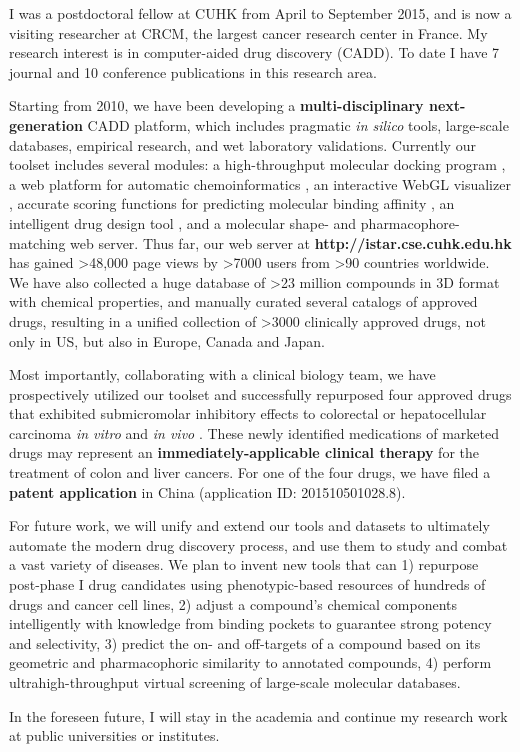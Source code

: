 \documentclass[a4paper,12pt]{article}
\begin{document}
I was a postdoctoral fellow at CUHK from April to September 2015, and is now a visiting researcher at CRCM, the largest cancer research center in France. My research interest is in computer-aided drug discovery (CADD). To date I have 7 journal and 10 conference publications in this research area.

Starting from 2010, we have been developing a \textbf{multi-disciplinary next-generation} CADD platform, which includes pragmatic \textit{in silico} tools, large-scale databases, empirical research, and wet laboratory validations. Currently our toolset includes several modules: a high-throughput molecular docking program \cite{1153}, a web platform for automatic chemoinformatics \cite{1362}, an interactive WebGL visualizer \cite{1366}, accurate scoring functions for predicting molecular binding affinity \cite{1432,1647,1434,1663}, an intelligent drug design tool \cite{1409,1387}, and a molecular shape- and pharmacophore-matching web server. Thus far, our web server at \textbf{http://istar.cse.cuhk.edu.hk} has gained \textgreater48,000 page views by \textgreater7000 users from \textgreater90 countries worldwide. We have also collected a huge database of \textgreater23 million compounds in 3D format with chemical properties, and manually curated several catalogs of approved drugs, resulting in a unified collection of \textgreater3000 clinically approved drugs, not only in US, but also in Europe, Canada and Japan.

Most importantly, collaborating with a clinical biology team, we have prospectively utilized our toolset and successfully repurposed four approved drugs that exhibited submicromolar inhibitory effects to colorectal or hepatocellular carcinoma \textit{in vitro} and \textit{in vivo} \cite{1667,1681}. These newly identified medications of marketed drugs may represent an \textbf{immediately-applicable clinical therapy} for the treatment of colon and liver cancers. For one of the four drugs, we have filed a \textbf{patent application} in China (application ID: 201510501028.8).

For future work, we will unify and extend our tools and datasets to ultimately automate the modern drug discovery process, and use them to study and combat a vast variety of diseases. We plan to invent new tools that can 1) repurpose post-phase I drug candidates using phenotypic-based resources of hundreds of drugs and cancer cell lines, 2) adjust a compound's chemical components intelligently with knowledge from binding pockets to guarantee strong potency and selectivity, 3) predict the on- and off-targets of a compound based on its geometric and pharmacophoric similarity to annotated compounds, 4) perform ultrahigh-throughput virtual screening of large-scale molecular databases.

In the foreseen future, I will stay in the academia and continue my research work at public universities or institutes.

\linespread{0.5}
\tiny


\end{document}
